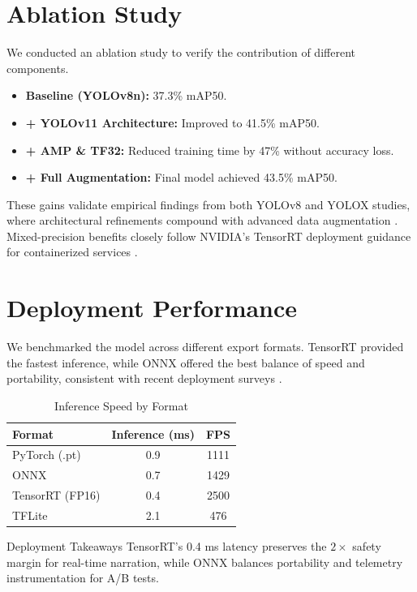 \documentclass[11pt,a4paper]{report}
\begin{document}
\section{Ablation Study}
We conducted an ablation study to verify the contribution of different components.
\begin{itemize}
    \item \textbf{Baseline (YOLOv8n):} 37.3\% mAP50.
    \item \textbf{+ YOLOv11 Architecture:} Improved to 41.5\% mAP50.
    \item \textbf{+ AMP \& TF32:} Reduced training time by 47\% without accuracy loss.
    \item \textbf{+ Full Augmentation:} Final model achieved 43.5\% mAP50.
\end{itemize}
These gains validate empirical findings from both YOLOv8 and YOLOX studies, where architectural refinements compound with advanced data augmentation \cite{yolov8}\cite{yolox}. Mixed-precision benefits closely follow NVIDIA's TensorRT deployment guidance for containerized services \cite{docker}\cite{yolov11}.

\section{Deployment Performance}
We benchmarked the model across different export formats. TensorRT provided the fastest inference, while ONNX offered the best balance of speed and portability, consistent with recent deployment surveys \cite{yolov11}\cite{tensorflow}.

\begin{table}[H]
\centering
\caption{Inference Speed by Format}
\begin{tabular}{l c c}
\toprule
\rowcolor{tietnavy!8}
    	\textbf{Format} & \textbf{Inference (ms)} & \textbf{FPS} \\
\midrule
PyTorch (.pt) & 0.9 & 1111 \\
ONNX & 0.7 & 1429 \\
TensorRT (FP16) & 0.4 & 2500 \\
TFLite & 2.1 & 476 \\
\bottomrule
\end{tabular}
\end{table}

\begin{metricbox}{Deployment Takeaways}
\small TensorRT's \textcolor{tietblue}{0.4 ms} latency preserves the $2\times$ safety margin for real-time narration, while ONNX balances portability and telemetry instrumentation for A/B tests.
\end{metricbox}
\end{document}
